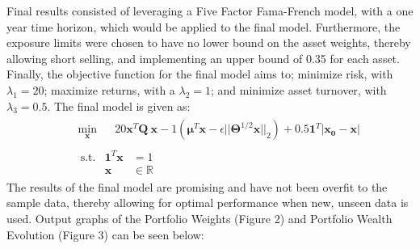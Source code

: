 \documentclass[10pt]{article}
\begin{document}
Final results consisted of leveraging a Five Factor Fama-French model, with a one year time horizon, which would be applied to the final model. Furthermore, the exposure limits were chosen to have no lower bound on the asset weights, thereby allowing short selling, and implementing an upper bound of 0.35 for each asset. Finally, the objective function for the final model aims to; minimize risk, with $\lambda_1 =20$; maximize returns, with a $\lambda_2=1$; and minimize asset turnover, with $\lambda_3=0.5$.  The final model is given as: 
\[
\begin{aligned}
&\begin{aligned}
    & \min_{\bm{x}}     &&20 \bm{x}^T \bm{Q}\ \bm{x} - 1(\bm{\mu}^T \bm{x}  - \epsilon || \bm{\Theta}^{1/2}\bm{x} ||_2) + 0.5\bm{1}^T |\bm{x_0} - \bm{x}|
\end{aligned} \\
&\begin{aligned}
    &\ \mathrm{s.t.}        & \bm{1}^T \bm{x} &= 1 \\
    &                   & \bm{x} &\in \bm{\mathbb{R}}
\end{aligned}
\end{aligned}
\]
The results of the final model are promising and have not been overfit to the sample data, thereby allowing for optimal performance when new, unseen data is used. Output graphs of the Portfolio Weights (Figure 2) and Portfolio Wealth Evolution (Figure 3) can be seen below:
\end{document}
